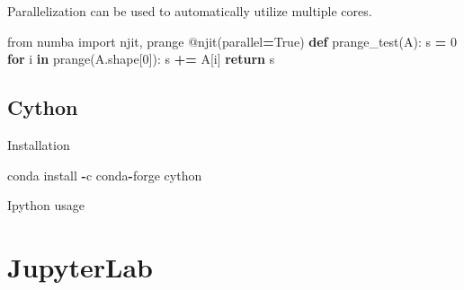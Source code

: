 \documentclass[]{book}
\newenvironment{Shaded}{\begin{snugshade}}{\end{snugshade}}
\newcommand{\AttributeTok}[1]{\textcolor[rgb]{0.77,0.63,0.00}{#1}}
\newcommand{\BuiltInTok}[1]{#1}
\newcommand{\ControlFlowTok}[1]{\textcolor[rgb]{0.13,0.29,0.53}{\textbf{#1}}}
\newcommand{\DecValTok}[1]{\textcolor[rgb]{0.00,0.00,0.81}{#1}}
\newcommand{\ImportTok}[1]{#1}
\newcommand{\KeywordTok}[1]{\textcolor[rgb]{0.13,0.29,0.53}{\textbf{#1}}}
\newcommand{\NormalTok}[1]{#1}
\newcommand{\OperatorTok}[1]{\textcolor[rgb]{0.81,0.36,0.00}{\textbf{#1}}}
\newcommand{\VariableTok}[1]{\textcolor[rgb]{0.00,0.00,0.00}{#1}}
\begin{document}
Parallelization can be used to automatically utilize multiple cores.

\begin{Shaded}
\begin{Highlighting}[]
\ImportTok{from}\NormalTok{ numba }\ImportTok{import}\NormalTok{ njit, prange}
\AttributeTok{@njit}\NormalTok{(parallel}\OperatorTok{=}\VariableTok{True}\NormalTok{)}
\KeywordTok{def}\NormalTok{ prange_test(A):}
\NormalTok{    s }\OperatorTok{=} \DecValTok{0}
    \ControlFlowTok{for}\NormalTok{ i }\KeywordTok{in}\NormalTok{ prange(A.shape[}\DecValTok{0}\NormalTok{]):}
\NormalTok{        s }\OperatorTok{+=}\NormalTok{ A[i]}
    \ControlFlowTok{return}\NormalTok{ s}
\end{Highlighting}
\end{Shaded}

\hypertarget{cython}{%
\section{Cython}\label{cython}}

Installation

\begin{Shaded}
\begin{Highlighting}[]
\NormalTok{conda install }\OperatorTok{-}\NormalTok{c conda}\OperatorTok{-}\NormalTok{forge cython}
\end{Highlighting}
\end{Shaded}

Ipython usage

\begin{Shaded}
\end{Shaded}

\hypertarget{jupyter}{%
\chapter{JupyterLab}\label{jupyter}}
\end{document}
